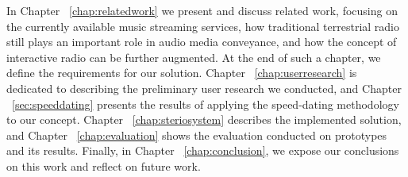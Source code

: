 In Chapter ~\ref{chap:relatedwork} we present and discuss related work, focusing on the currently available music streaming services, how traditional terrestrial radio still plays an important role in audio media conveyance, and how the concept of interactive radio can be further augmented. At the end of such a chapter, we define the requirements for our solution. Chapter ~\ref{chap:userresearch} is dedicated to describing the preliminary user research we conducted, and Chapter ~\ref{sec:speeddating} presents the results of applying the speed-dating methodology to our concept. Chapter ~\ref{chap:steriosystem} describes the implemented solution, and Chapter ~\ref{chap:evaluation} shows the evaluation conducted on prototypes and its results. Finally, in Chapter ~\ref{chap:conclusion}, we expose our conclusions on this work and reflect on future work.

